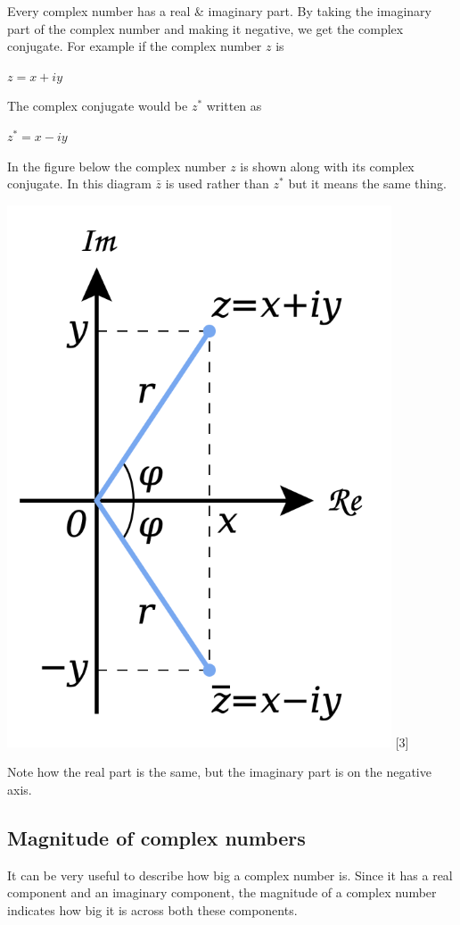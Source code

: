 \documentclass{book}
\begin{document}
Every complex number has a real \& imaginary part. By taking the imaginary part of the complex number and making it negative, we get the complex conjugate. For example if the complex number $z$ is 

$z = x + iy$ 

The complex conjugate would be $z^*$ written as 

$z^* = x - iy$ 

In the figure below the complex number $z$ is shown along with its complex conjugate. In this diagram $\bar{z}$ is used rather than $z^*$ but it means the same thing.  

\includegraphics[scale=0.5]{images/Complex_conjugate_picture.svg.png}
 [3]

 Note how the real part is the same, but the imaginary part is on the negative axis. 

 \subsection{ Magnitude of complex numbers }

 It can be very useful to describe how big a complex number is. Since it has a real component and an imaginary component, the magnitude of a complex number indicates how big it is across both these components. 
\end{document}
